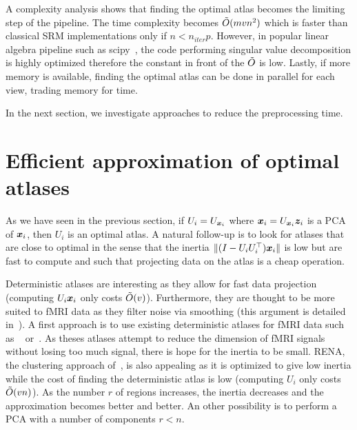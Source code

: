 A complexity analysis  shows that finding the optimal atlas becomes the limiting step of the pipeline. The time complexity becomes $\tilde{O}(mvn^2)$ which is faster than classical SRM implementations only if $n < n_{iter} p$. However, in popular
linear algebra pipeline such as scipy~\cite{2020SciPy-NMeth}, the code
performing singular value decomposition is highly optimized therefore the
constant in front of the $\tilde{O}$ is low. Lastly, if more memory is available, finding the optimal atlas can be done in parallel for each view, trading memory for time.

In the next section, we investigate approaches to reduce the preprocessing time.

\section{Efficient approximation of optimal atlases}
As we have seen in the previous section, if $U_i = U_{\boldsymbol{x}_i}$ where $\boldsymbol{x}_i =
U_{\boldsymbol{x}_i} \boldsymbol{z}_i$ is a PCA of $\boldsymbol{x}_i$, then $U_i$ is an optimal atlas.
A natural follow-up is to look for atlases that are close to optimal in the
sense that the inertia $\| (I - U_i U_i^{\top}) \boldsymbol{x}_i \|$ is low but are fast to
compute and such that projecting data on the atlas is a cheap operation.

Deterministic atlases are interesting as they allow for fast data projection
(computing $U_i \boldsymbol{x}_i$ only costs $\tilde{O}(v)$). Furthermore, they are thought to
be more suited to fMRI data as they filter noise via smoothing (this argument is
detailed in~\cite{hoyos2018recursive}).
A first approach is to use existing deterministic atlases for fMRI data such as 
~\cite{schaefer2017local} or~\cite{bellec2010multi}. As theses atlases
attempt to reduce the dimension of fMRI signals without losing too much signal,
there is hope for the inertia to be small.
RENA, the clustering approach
of~\cite{hoyos2018recursive}, is also appealing as it is optimized to give low
inertia while the cost of finding the deterministic atlas is low (computing $U_i$ only costs
$\tilde{O}(vn)$). As the number $r$ of regions increases, the inertia decreases
and the approximation becomes better and better. An other possibility is to
perform a PCA with a number of components $r < n$.

